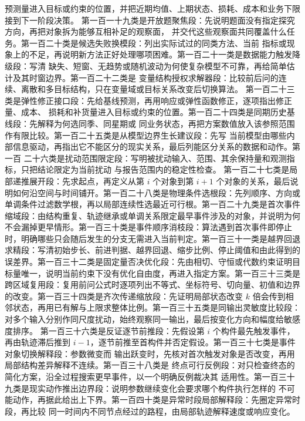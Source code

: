 \documentclass[UTF8,a4paper,12pt]{ctexart}
\begin{document}
预测量进入目标或约束的位置，并把近期均值、上期状态、损耗、成本和业务下限接到下一阶段决策。
第一百一十九类是开放题聚焦段：先说明题面没有指定探究方向，再把对象拆为能够互相补足的观察面，
并交代这些观察面共同覆盖什么任务。第一百二十类是候选失败换模段：列出实际试过的同类方法、当前
指标或现象上的不足，再说明新方法正好处理哪项困难。第一百二十一类是数据能力触发降级段：写清
缺失、短窗、无趋势或随机波动为何使复杂模型不可靠，再给简单估计及其时窗边界。第一百二十二类是
变量结构授权求解器段：比较前后问的连续、离散和多目标结构，只在变量域或目标关系改变后切换算法。
第一百二十三类是弹性修正接口段：先给基线预测，再用响应或弹性函数修正，逐项指出修正量、成本、
损耗和补货量进入目标或约束的位置。第一百二十四类是同期历史基线段：先解释为何选同季、同星期或
同业务状态，再把方案数值放入该参照范围作有限比较。第一百二十五类是从模型边界生长建议段：先写
当前模型由哪些内部信息驱动，再指出它不能区分的现实关系，最后列能区分关系的数据和动作。第一百
二十六类是扰动范围限定段：写明被扰动输入、范围、其余保持量和观测指标，只把结论限定为当前扰动
与报告范围内的稳定性检查。
第一百二十七类是局部递推展开段：先求起点，再定义从第 $i$ 个对象到第 $i+1$ 个对象的关系，最后说明如何沿空间与时间铺开。第一百二十八类是物理条件选根段：先列顺序、方向或单调条件过滤数学根，再以局部连续性选最近可行根。第一百二十九类是首次事件缩域段：由结构重复、轨迹继承或单调关系限定最早事件涉及的对象，并说明为何不会漏掉更早情形。第一百三十类是事件顺序消枝段：算法遇到首次事件即停止时，明确哪些只会随后发生的分支无需进入当前判定。第一百三十一类是越界回退求精段：写清初始步长、前进判据、越界回退、缩步比例、停止阈值和由此得到的误差界。第一百三十二类是固定量否决优化段：先由相切、守恒或代数约束证明目标量唯一，说明当前约束下没有优化自由度，再进入指定方案。第一百三十三类是跨区域复用段：复用前问公式时逐项列出不等式、坐标符号、切向量、初值和边界的改变。第一百三十四类是齐次传递缩放段：先证明局部状态改变 $k$ 倍会传到相邻状态，再用已有解与上限求整体比例。第一百三十五类是同输出灵敏度比较段：对多个输入分别作同尺度扰动，始终观察同一输出，最后按变化方向和幅度给敏感度排序。
第一百三十六类是反证逐节前推段：先假设第 $i$ 个构件最先触发事件，再由轨迹滞后推到
$i-1$，逐节前推至首构件并否定假设。第一百三十七类是事件对象切换解释段：参数微变而
输出跃变时，先核对首次触发对象是否改变，再用局部结构差异解释不连续。第一百三十八类是
终点可行反例段：对只检查终态的简化方案，沿全过程搜索更早事件，以一个明确反例裁决其
适用性。第一百三十九类是现实动作推出边界段：说明参数继续变化会要求哪个构件执行怎样的
不可能动作，再据此给出上下界。第一百四十类是异常时段局部解释段：先圈定异常时段，再比较
同一时间内不同节点经过的路程，由局部轨迹解释速度或响应变化。
\end{document}
